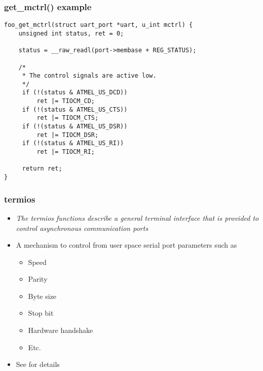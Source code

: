 \begin{frame}[fragile]
\frametitle{get\_mctrl() example}
\begin{verbatim}
foo_get_mctrl(struct uart_port *uart, u_int mctrl) {
    unsigned int status, ret = 0;

    status = __raw_readl(port->membase + REG_STATUS);

    /*
     * The control signals are active low.
     */
     if (!(status & ATMEL_US_DCD))
         ret |= TIOCM_CD;
     if (!(status & ATMEL_US_CTS))
         ret |= TIOCM_CTS;
     if (!(status & ATMEL_US_DSR))
         ret |= TIOCM_DSR;
     if (!(status & ATMEL_US_RI))
         ret |= TIOCM_RI;

     return ret;
}
\end{verbatim}
\end{frame}

\begin{frame}
  \frametitle{termios}
  \begin{itemize}
  \item \emph{The termios functions describe a general terminal
      interface that is provided to control asynchronous
      communication ports}
  \item A mechanism to control from user space serial port parameters
    such as
    \begin{itemize}
    \item Speed
    \item Parity
    \item Byte size
    \item Stop bit
    \item Hardware handshake
    \item Etc.
    \end{itemize}
  \item See  for details
  \end{itemize}
\end{frame}

